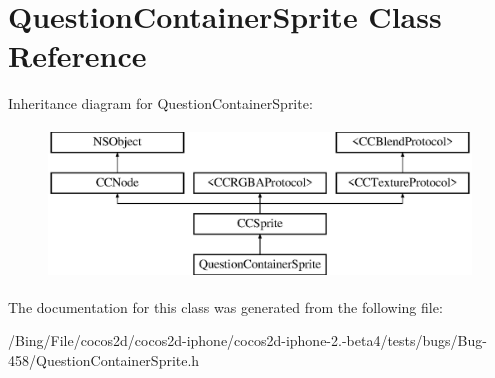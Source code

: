 \hypertarget{interface_question_container_sprite}{\section{Question\-Container\-Sprite Class Reference}
\label{interface_question_container_sprite}
}
Inheritance diagram for Question\-Container\-Sprite\-:\begin{figure}[H]
\begin{center}
\leavevmode
\includegraphics[height=4.000000cm]{interface_question_container_sprite}
\end{center}
\end{figure}


The documentation for this class was generated from the following file\-:\begin{DoxyCompactItemize}
\item 
/\-Bing/\-File/cocos2d/cocos2d-\/iphone/cocos2d-\/iphone-\/2.-\/beta4/tests/bugs/\-Bug-\/458/Question\-Container\-Sprite.\-h\end{DoxyCompactItemize}
